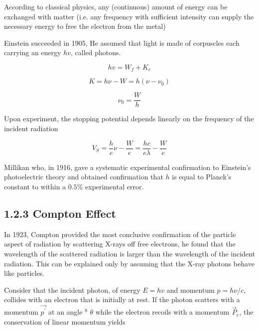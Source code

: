 \documentclass[10pt]{article}
\begin{document}
    According to classical physics, any (continuous) amount of energy can be exchanged with matter (i.e. any frequency with sufficient intensity can supply the necessary energy to free the electron from the metal)

    Einstein succeeded in 1905, He assumed that light is made of corpuscles each carrying an energy $h v$, called photons. 

    \begin{equation} \label{eq:12}
        h v=W_f+K_e 
    \end{equation}

    \begin{equation} \label{eq:13}
        K=h \nu-W=h\left(\nu-\nu_0\right) 
    \end{equation}

    \begin{equation}
        \nu_0 = \frac{W}{h}
    \end{equation}

    Upon experiment, the stopping potential depends linearly on the frequency of the incident radiation

    \begin{equation} \label{eq:14}
        V_{S}=\frac{h}{e} \nu-\frac{W}{e}=\frac{h c}{e \lambda}-\frac{W}{e} 
    \end{equation}

    Millikan who, in 1916, gave a systematic experimental confirmation to Einstein's photoelectric theory and obtained confirmation that $h$ is equal to Planck's constant to within a $0.5 \%$ experimental error.

\subsection*{1.2.3 Compton Effect}
    In 1923, Compton provided the most conclusive confirmation of the particle aspect of radiation by scattering X-rays off free electrons, he found that the wavelength of the scattered radiation is larger than the wavelength of the incident radiation. This can be explained only by assuming that the X-ray photons behave like particles.

    Consider that the incident photon, of energy $E=h v$ and momentum $p=h \nu / c$, collides with an electron that is initially at rest. If the photon scatters with a momentum $\overrightarrow{p^{\prime}}$ at an angle ${ }^{8}$ $\theta$ while the electron recoils with a momentum $\vec{P}_{e}$, the conservation of linear momentum yields
\end{document}
